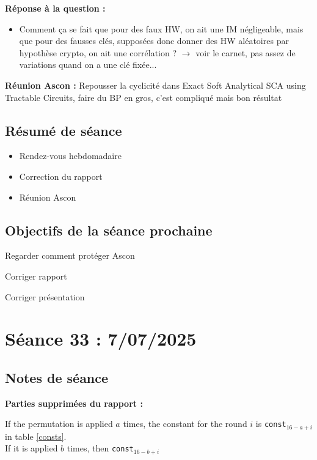 \documentclass[12pt]{article}
\begin{document}
	\noindent \textbf{Réponse à la question :}
	\begin{itemize}
		\item Comment ça se fait que pour des faux HW, on ait une IM négligeable, mais que pour des fausses clés, supposées donc donner des HW aléatoires par hypothèse crypto, on ait une corrélation ? $\rightarrow$ voir le carnet, pas assez de variations quand on a une clé fixée...
	\end{itemize}
	
	\noindent \textbf{Réunion Ascon :} Repousser la cyclicité dans Exact Soft Analytical SCA using Tractable Circuits, faire du BP en gros, c'est compliqué mais bon résultat
	
	\subsection{Résumé de séance}
	\begin{itemize}
		\item Rendez-vous hebdomadaire
		\item Correction du rapport
		\item Réunion Ascon
	\end{itemize}
	
	\subsection{Objectifs de la séance prochaine}
	\begin{todolist}
		\item Regarder comment protéger Ascon
		\item Corriger rapport
		\item Corriger présentation
	\end{todolist}
	
	
	\section{Séance 33 : 7/07/2025}
	\subsection{Notes de séance}
	\textbf{Parties supprimées du rapport :}
	
	If the permutation is applied $a$ times, the constant for the round $i$ is \verb|const|$_{16-a+i}$ in table \ref{consts}.\\
	If it is applied $b$ times, then \verb|const|$_{16-b+i}$ 
	
\end{document}

